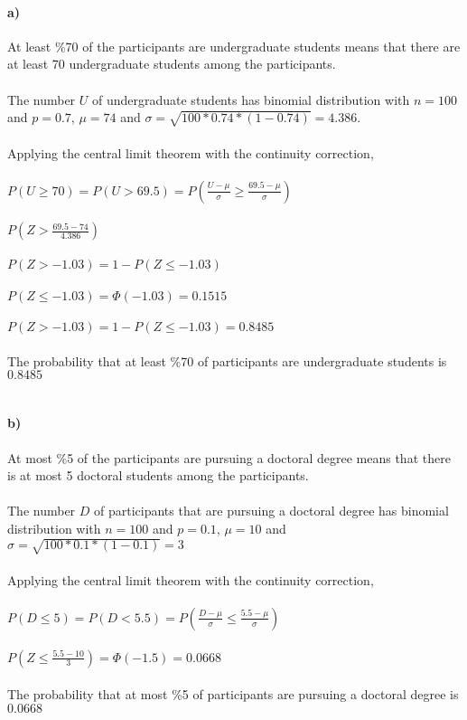 \documentclass[12pt]{article}
\begin{document}
\paragraph{a)}
At least \%70 of the participants are undergraduate students means that there are at least 70 undergraduate students among the participants.\\\\
The number $U$ of undergraduate students has binomial distribution with $n = 100$ and $p = 0.7$, $\mu = 74$ and $\sigma = \sqrt{100*0.74*(1-0.74)} = 4.386$.\\\\
Applying the central limit theorem with the continuity correction,\\\\
$P(U \geq 70) = P(U > 69.5) = P(\frac{U-\mu}{\sigma} \geq \frac{69.5-\mu}{\sigma})$\\\\
$P(Z > \frac{69.5-74}{4.386})$\\\\
$P(Z > -1.03) = 1 - P(Z \leq -1.03)$\\\\
$P(Z \leq -1.03) = \Phi(-1.03) = 0.1515$\\\\
$P(Z > -1.03) = 1 - P(Z \leq -1.03) = 0.8485$\\\\
The probability that at least \%70 of participants are undergraduate students is $0.8485$\\\\

\newpage
\paragraph{b)}
At most \%5 of the participants are pursuing a doctoral degree means that there is at most 5 doctoral students among the participants.\\\\
The number $D$ of participants that are pursuing a doctoral degree has binomial distribution with $n = 100$ and $p = 0.1$, $\mu = 10$ and $\sigma = \sqrt{100*0.1*(1-0.1)} = 3$\\\\
Applying the central limit theorem with the continuity correction,\\\\
$P(D \leq 5) = P(D < 5.5) = P(\frac{D-\mu}{\sigma} \leq \frac{5.5-\mu}{\sigma})$\\\\
$P(Z \leq \frac{5.5-10}{3}) = \Phi(-1.5) = 0.0668$\\\\
The probability that at most \%5 of participants are pursuing a doctoral degree is $0.0668$\\\\
\end{document}
